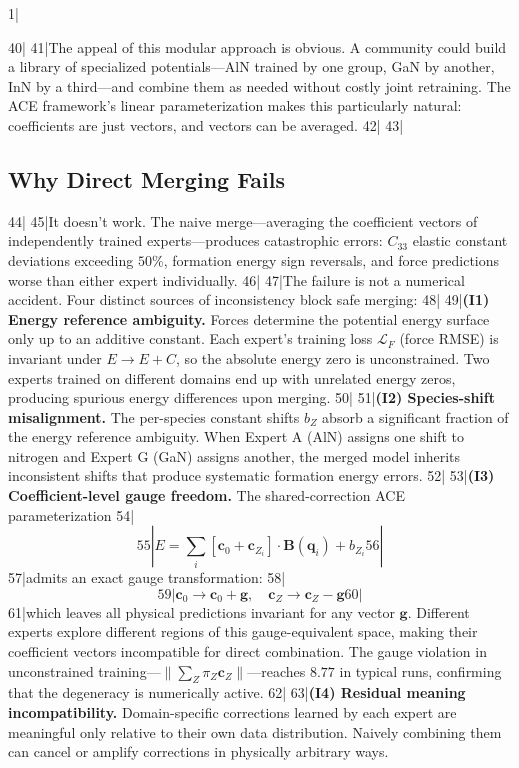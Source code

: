 1|\documentclass[12pt,a4paper]{article}
\begin{document}
40|
41|The appeal of this modular approach is obvious. A community could build a library of specialized potentials—AlN trained by one group, GaN by another, InN by a third—and combine them as needed without costly joint retraining. The ACE framework's linear parameterization makes this particularly natural: coefficients are just vectors, and vectors can be averaged.
42|
43|\subsection{Why Direct Merging Fails}
44|
45|It doesn't work. The naive merge—averaging the coefficient vectors of independently trained experts—produces catastrophic errors: $C_{33}$ elastic constant deviations exceeding $50\%$, formation energy sign reversals, and force predictions worse than either expert individually.
46|
47|The failure is not a numerical accident. Four distinct sources of inconsistency block safe merging:
48|
49|\textbf{(I1) Energy reference ambiguity.} Forces determine the potential energy surface only up to an additive constant. Each expert's training loss $\mathcal{L}_F$ (force RMSE) is invariant under $E \to E + C$, so the absolute energy zero is unconstrained. Two experts trained on different domains end up with unrelated energy zeros, producing spurious energy differences upon merging.
50|
51|\textbf{(I2) Species-shift misalignment.} The per-species constant shifts $b_Z$ absorb a significant fraction of the energy reference ambiguity. When Expert A (AlN) assigns one shift to nitrogen and Expert G (GaN) assigns another, the merged model inherits inconsistent shifts that produce systematic formation energy errors.
52|
53|\textbf{(I3) Coefficient-level gauge freedom.} The shared-correction ACE parameterization
54|\[
55|E = \sum_i [\mathbf{c}_0 + \mathbf{c}_{Z_i}] \cdot \mathbf{B}(\mathbf{q}_i) + b_{Z_i}
56|\]
57|admits an exact gauge transformation:
58|\[
59|\mathbf{c}_0 \to \mathbf{c}_0 + \mathbf{g}, \quad \mathbf{c}_Z \to \mathbf{c}_Z - \mathbf{g}
60|\]
61|which leaves all physical predictions invariant for any vector $\mathbf{g}$. Different experts explore different regions of this gauge-equivalent space, making their coefficient vectors incompatible for direct combination. The gauge violation in unconstrained training—$\lVert\sum_Z \pi_Z \mathbf{c}_Z\rVert$—reaches $8.77$ in typical runs, confirming that the degeneracy is numerically active.
62|
63|\textbf{(I4) Residual meaning incompatibility.} Domain-specific corrections learned by each expert are meaningful only relative to their own data distribution. Naively combining them can cancel or amplify corrections in physically arbitrary ways.
\end{document}
